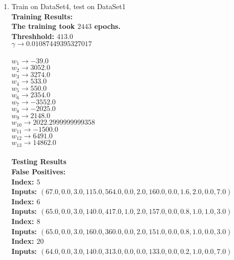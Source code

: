 \begin{enumerate}
\begin{enumerate}
				\item{Train on DataSet4, test on DataSet1} \\
					\bf{Training Results: } \\
						\textnormal{The training took } \(2443\) \textnormal{ epochs. } \\
						\textnormal{Threshhold:} \( 413.0 \) \\
						\( \gamma \rightarrow 0.01087449395327017 \) \\ \\
						\( w_{1} \rightarrow -39.0 \) \\
						\( w_{2} \rightarrow 3052.0 \) \\
						\( w_{3} \rightarrow 3274.0 \) \\
						\( w_{4} \rightarrow 533.0 \) \\
						\( w_{5} \rightarrow 550.0 \) \\
						\( w_{6} \rightarrow 2354.0 \) \\
						\( w_{7} \rightarrow -3552.0 \) \\
						\( w_{8} \rightarrow -2025.0 \) \\
						\( w_{9} \rightarrow 2148.0 \) \\
						\( w_{10} \rightarrow 2022.2999999999358 \) \\
						\( w_{11} \rightarrow -1500.0 \) \\
						\( w_{12} \rightarrow 6491.0 \) \\
						\( w_{13} \rightarrow 14862.0 \) \\ \\
					\bf{Testing Results} \\
					\textnormal{False Positives: } \\
					\textnormal{Index: } \( 5 \) \\
					\textnormal{Inputs: } \( (67.0, 0.0, 3.0, 115.0, 564.0, 0.0, 2.0, 160.0, 0.0, 1.6, 2.0, 0.0, 7.0) \) \\
					\textnormal{Index: } \( 6 \) \\
					\textnormal{Inputs: } \( (65.0, 0.0, 3.0, 140.0, 417.0, 1.0, 2.0, 157.0, 0.0, 0.8, 1.0, 1.0, 3.0) \) \\
					\textnormal{Index: } \( 8 \) \\
					\textnormal{Inputs: } \( (65.0, 0.0, 3.0, 160.0, 360.0, 0.0, 2.0, 151.0, 0.0, 0.8, 1.0, 0.0, 3.0) \) \\
					\textnormal{Index: } \( 20 \) \\
					\textnormal{Inputs: } \( (64.0, 0.0, 3.0, 140.0, 313.0, 0.0, 0.0, 133.0, 0.0, 0.2, 1.0, 0.0, 7.0) \) \\

\end{enumerate}
\end{enumerate}

